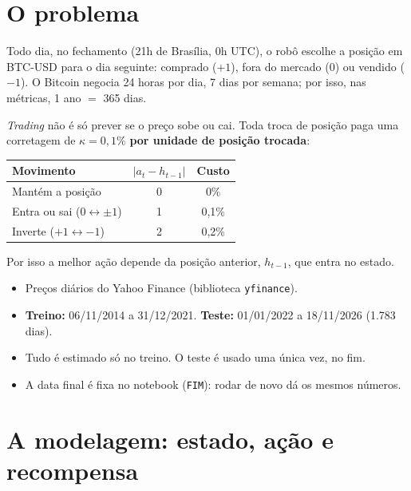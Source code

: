 \documentclass[11pt,a4paper]{article}
\newcommand{\bloco}[1]{\par\needspace{4\baselineskip}{\bfseries #1}\par\nopagebreak}
\begin{document}
\newpage

\section{O problema}

Todo dia, no fechamento (21h de Brasília, 0h UTC), o robô escolhe a posição em BTC-USD para o dia seguinte: comprado ($+1$), fora do mercado ($0$) ou vendido ($-1$). O Bitcoin negocia 24 horas por dia, 7 dias por semana; por isso, nas métricas, 1 ano $=$ 365 dias.

\textit{Trading} não é só prever se o preço sobe ou cai. Toda troca de posição paga uma corretagem de $\kappa = 0{,}1\%$ \textbf{por unidade de posição trocada}:

\begin{center}
\begin{tabular}{l c c}
  \toprule
  \textbf{Movimento} & $|a_t - h_{t-1}|$ & \textbf{Custo} \\
  \midrule
  Mantém a posição                         & 0 & 0\% \\
  Entra ou sai ($0 \leftrightarrow \pm 1$)  & 1 & 0,1\% \\
  Inverte ($+1 \leftrightarrow -1$)         & 2 & 0,2\% \\
  \bottomrule
\end{tabular}
\end{center}

Por isso a melhor ação depende da posição anterior, $h_{t-1}$, que entra no estado.

\bloco{Dados}
\begin{itemize}
  \item Preços diários do Yahoo Finance (biblioteca \texttt{yfinance}).
  \item \textbf{Treino:} 06/11/2014 a 31/12/2021. \textbf{Teste:} 01/01/2022 a 18/11/2026 (1.783 dias).
  \item Tudo é estimado só no treino. O teste é usado uma única vez, no fim.
  \item A data final é fixa no notebook (\texttt{FIM}): rodar de novo dá os mesmos números.
\end{itemize}

\section{A modelagem: estado, ação e recompensa}
\end{document}

